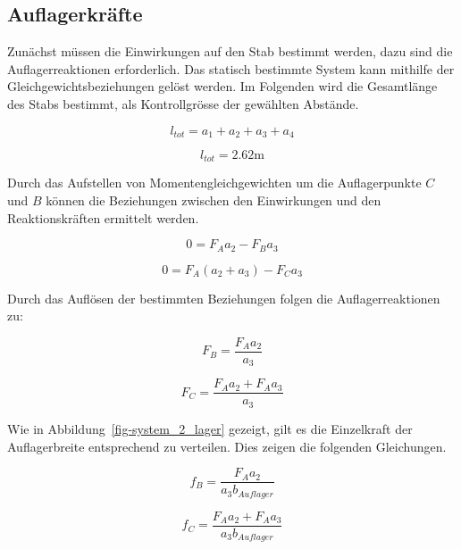 \documentclass[
  12pt,
  letterpaper,
  egregdoesnotlikesansseriftitles]{scrreprt}
\begin{document}
\hypertarget{auflagerkruxe4fte}{%
\subsection{Auflagerkräfte}\label{auflagerkruxe4fte}}

Zunächst müssen die Einwirkungen auf den Stab bestimmt werden, dazu sind
die Auflagerreaktionen erforderlich. Das statisch bestimmte System kann
mithilfe der Gleichgewichtsbeziehungen gelöst werden. Im Folgenden wird
die Gesamtlänge des Stabs bestimmt, als Kontrollgrösse der gewählten
Abstände.

\begin{equation}l_{tot} = a_{1} + a_{2} + a_{3} + a_{4}\end{equation}

\begin{equation}l_{tot} = 2.62 \text{m}\end{equation}

Durch das Aufstellen von Momentengleichgewichten um die Auflagerpunkte
\(C\) und \(B\) können die Beziehungen zwischen den Einwirkungen und den
Reaktionskräften ermittelt werden.

\begin{equation}0 = F_{A} a_{2} - F_{B} a_{3}\end{equation}

\begin{equation}0 = F_{A} \left(a_{2} + a_{3}\right) - F_{C} a_{3}\end{equation}

Durch das Auflösen der bestimmten Beziehungen folgen die
Auflagerreaktionen zu:

\begin{equation}F_{B} = \frac{F_{A} a_{2}}{a_{3}}\end{equation}

\begin{equation}F_{C} = \frac{F_{A} a_{2} + F_{A} a_{3}}{a_{3}}\end{equation}

Wie in Abbildung~\ref{fig-system_2_lager} gezeigt, gilt es die
Einzelkraft der Auflagerbreite entsprechend zu verteilen. Dies zeigen
die folgenden Gleichungen.

\begin{equation}f_{B} = \frac{F_{A} a_{2}}{a_{3} b_{Auflager}}\end{equation}

\begin{equation}f_{C} = \frac{F_{A} a_{2} + F_{A} a_{3}}{a_{3} b_{Auflager}}\end{equation}
\end{document}
